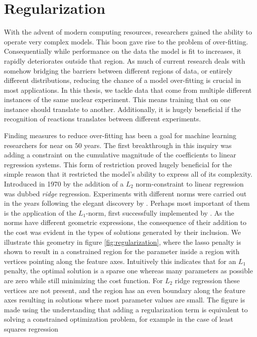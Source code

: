 \section{Regularization}\label{sec:regularization}

With the advent of modern computing resources, researchers gained the ability to operate very complex models. This boon gave rise to the problem of over-fitting. Consequentially while performance on the data the model is fit to increases, it rapidly deteriorates outside that region. As much of current research deals with somehow bridging the barriers between different regions of data, or entirely different distributions, reducing the chance of a model over-fitting is crucial in most applications. In this thesis, we tackle data that come from multiple different instances of the same nuclear experiment. This means training that on one instance should translate to another. Additionally, it is hugely beneficial if the recognition of reactions translates between different experiments.   

Finding measures to reduce over-fitting has been a goal for machine learning researchers for near on $50$ years. The first breakthrough in this inquiry was adding a constraint on the cumulative magnitude of the coefficients to linear regression systems. This form of restriction proved hugely beneficial for the simple reason that it restricted the model's ability to express all of its complexity. Introduced in 1970 by \citet{Hoerl1970} the addition of a $L_2$ norm-constraint to linear regression was dubbed \textit{ridge} regression. Experiments with different norms were carried out in the years following the elegant discovery by \citet{Hoerl1970}. Perhaps most important of them is the application of the $L_1$-norm, first successfully implemented by \citet{Tibshirani1996}. As the norms have different geometric expressions, the consequence of their addition to the cost was evident in the types of solutions generated by their inclusion. We illustrate this geometry in figure \ref{fig:regularization}, where the lasso penalty is shown to result in a constrained region for the parameter inside a region with vertices pointing along the feature axes. Intuitively this indicates that for an $L_1$ penalty, the optimal solution is a sparse one whereas many parameters as possible are zero while still minimizing the cost function. For $L_2$ ridge regression these vertices are not present, and the region has an even boundary along the feature axes resulting in solutions where most parameter values are small. The figure is made using the understanding that adding a regularization term is equivalent to solving a constrained optimization problem, for example in the case of least squares regression 

